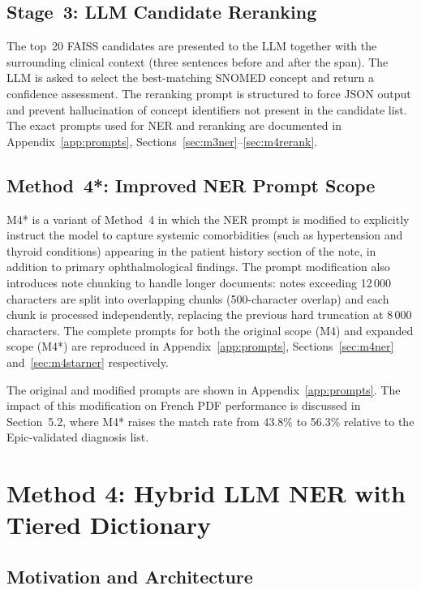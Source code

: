 \subsection{Stage~3: LLM Candidate Reranking}

The top~20 FAISS candidates are presented to the LLM together with the surrounding clinical context (three sentences before and after the span). The LLM is asked to select the best-matching SNOMED concept and return a confidence assessment. The reranking prompt is structured to force JSON output and prevent hallucination of concept identifiers not present in the candidate list. The exact prompts used for NER and reranking are documented in Appendix~\ref{app:prompts}, Sections~\ref{sec:m3ner}--\ref{sec:m4rerank}.

\subsection{Method~4*: Improved NER Prompt Scope}

M4* is a variant of Method~4 in which the NER prompt is modified to explicitly instruct the model to capture systemic comorbidities (such as hypertension and thyroid conditions) appearing in the patient history section of the note, in addition to primary ophthalmological findings. The prompt modification also introduces note chunking to handle longer documents: notes exceeding 12\,000 characters are split into overlapping chunks (500-character overlap) and each chunk is processed independently, replacing the previous hard truncation at 8\,000 characters. The complete prompts for both the original scope (M4) and expanded scope (M4*) are reproduced in Appendix~\ref{app:prompts}, Sections~\ref{sec:m4ner} and~\ref{sec:m4starner} respectively.

The original and modified prompts are shown in Appendix~\ref{app:prompts}. The impact of this modification on French PDF performance is discussed in Section~5.2, where M4* raises the match rate from 43.8\% to 56.3\% relative to the Epic-validated diagnosis list.

\section{Method 4: Hybrid LLM NER with Tiered Dictionary}
\label{sec:m4}

\subsection{Motivation and Architecture}

